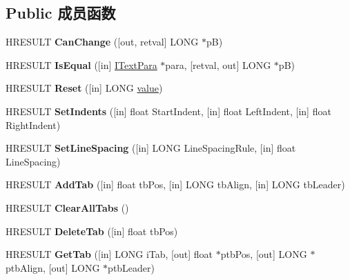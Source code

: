 \subsection*{Public 成员函数}
\begin{DoxyCompactItemize}
\item 
\mbox{\label{interfacetom_1_1_i_text_para_a1f03731bffa513e8aa2080646a1614a2}} 
H\+R\+E\+S\+U\+LT {\bfseries Can\+Change} (\mbox{[}out, retval\mbox{]} L\+O\+NG $\ast$pB)
\item 
\mbox{\label{interfacetom_1_1_i_text_para_a03a64c14048e2f8ab7b55b2dffd9400a}} 
H\+R\+E\+S\+U\+LT {\bfseries Is\+Equal} (\mbox{[}in\mbox{]} \hyperlink{interfacetom_1_1_i_text_para}{I\+Text\+Para} $\ast$para, \mbox{[}retval, out\mbox{]} L\+O\+NG $\ast$pB)
\item 
\mbox{\label{interfacetom_1_1_i_text_para_aeef8d3d97689653839ceca5a0982efc9}} 
H\+R\+E\+S\+U\+LT {\bfseries Reset} (\mbox{[}in\mbox{]} L\+O\+NG \hyperlink{unionvalue}{value})
\item 
\mbox{\label{interfacetom_1_1_i_text_para_ad4fed3a08078efacb64c7fae88b5e0a3}} 
H\+R\+E\+S\+U\+LT {\bfseries Set\+Indents} (\mbox{[}in\mbox{]} float Start\+Indent, \mbox{[}in\mbox{]} float Left\+Indent, \mbox{[}in\mbox{]} float Right\+Indent)
\item 
\mbox{\label{interfacetom_1_1_i_text_para_a488430cef85eb4b12ab84f345305cb2f}} 
H\+R\+E\+S\+U\+LT {\bfseries Set\+Line\+Spacing} (\mbox{[}in\mbox{]} L\+O\+NG Line\+Spacing\+Rule, \mbox{[}in\mbox{]} float Line\+Spacing)
\item 
\mbox{\label{interfacetom_1_1_i_text_para_a20d624d39554c48ab8cc955ceb33c0a7}} 
H\+R\+E\+S\+U\+LT {\bfseries Add\+Tab} (\mbox{[}in\mbox{]} float tb\+Pos, \mbox{[}in\mbox{]} L\+O\+NG tb\+Align, \mbox{[}in\mbox{]} L\+O\+NG tb\+Leader)
\item 
\mbox{\label{interfacetom_1_1_i_text_para_a97781fe7fa1e793cb0b1dad069a6d358}} 
H\+R\+E\+S\+U\+LT {\bfseries Clear\+All\+Tabs} ()
\item 
\mbox{\label{interfacetom_1_1_i_text_para_a31472d99442730d3e57facfb68df35fc}} 
H\+R\+E\+S\+U\+LT {\bfseries Delete\+Tab} (\mbox{[}in\mbox{]} float tb\+Pos)
\item 
\mbox{\label{interfacetom_1_1_i_text_para_ab9f52ba937f1d91e1cb0d54ca76ae2c1}} 
H\+R\+E\+S\+U\+LT {\bfseries Get\+Tab} (\mbox{[}in\mbox{]} L\+O\+NG i\+Tab, \mbox{[}out\mbox{]} float $\ast$ptb\+Pos, \mbox{[}out\mbox{]} L\+O\+NG $\ast$ptb\+Align, \mbox{[}out\mbox{]} L\+O\+NG $\ast$ptb\+Leader)
\end{DoxyCompactItemize}
